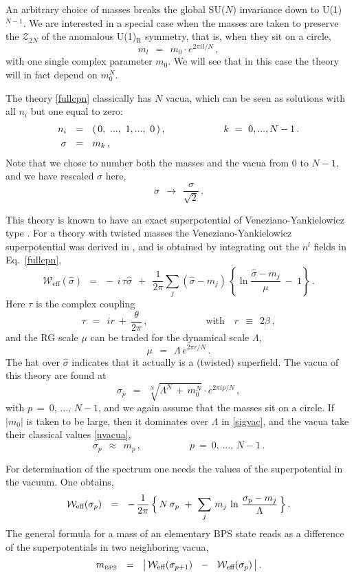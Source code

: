 \documentclass[epsfig,12pt]{article}
\def\beq{\begin{equation}}
\def\eeq{\end{equation}}
\def\beq{\begin{equation}}
\def\eeq{\end{equation}}
\newcommand{\mc}[1]{\mathcal{#1}}
\newcommand{\mbps}{m_{\text{\tiny BPS}}}
\newcommand{\W}{\mathcal{W}}
\newcommand{\hsigma}{{\hat{\sigma}}}
\begin{document}
	An arbitrary choice of masses breaks the global SU($N$) invariance down to U(1)$^{N-1}$.
	We are interested in a special case when the masses are taken to preserve the $ \mc{Z}_{2N} $ 
	of the anomalous U(1)$_\text{R}$ symmetry, that is, when they sit on a circle,
\beq
\label{mcirc}
	m_l ~~=~~ m_0 \cdot e^{2 \pi i l / N}\,,
\eeq
	with one single complex parameter $ m_0 $.
	We will see that in this case the theory will in fact depend on $ m_0^N $.


	The theory \eqref{fullcpn} classically has $ N $ vacua, which can be seen as solutions with all $ n_i $ but one 
	equal to zero:
\begin{align}
%
	n_i & ~~=~~ (\, 0,~ ...,~ 1, ...,~ 0\, )\,,  	\qquad\qquad\qquad  k ~=~ 0,..., N-1\,.
\notag
	\\
%
	\sigma & ~~=~~ m_k \,,
\label{nvacua}
\end{align}
	Note that we chose to number both the masses and the vacua from $0$ to $N-1$, and 
	we have rescaled $ \sigma $ here,
\beq
	\sigma ~~\to~~ \frac{\sigma}{\sqrt 2}\,.
\eeq

	This theory is known to have an exact superpotential of Veneziano-Yankielowicz type 
	\cite{VYan}.
	For a theory with twisted masses the Veneziano-Yankielowicz superpotential was 
	derived in \cite{AdDVecSal,ChVa,W93,HaHo,Dor}, 
	and is obtained by integrating out the $ n^l $ fields in Eq.~\eqref{fullcpn},
\beq
\label{Wfull}
	\W_\text{eff}(\hsigma) ~~=~~
		-\, i\, \tau \hsigma ~~+~~
		\frac{1}{2\pi} \sum_j (\hsigma - m_j)\, 
				      \left\{ \ln {\frac{\hsigma - m_j}{\mu}} ~-~ 1 \right\}\,.
\eeq
	Here $ \tau $ is the complex coupling
\beq
	\tau ~~=~~ i r ~+~ \frac{\theta}{2\pi}\,, \qquad\qquad\qquad   \text{with~~~} r ~~\equiv~~ 2\beta\,,
\eeq
	and the RG scale $ \mu $ can be traded for the dynamical scale $ \Lambda $,
\beq
	\mu ~~=~~ \Lambda\, e^{2\pi r/N}\,.
\eeq
	The hat over $ \hsigma $ indicates that it actually is a (twisted) superfield.
	The vacua of this theory are found at
\beq
\label{sigvac}
	\sigma_p ~~=~~ \sqrt[N] { \Lambda^N \,+\, m_0^N } \cdot e^{ 2\pi i p / N }\,, 
\eeq
	with $ p ~=~ 0,\,...,\, N-1 $, 
	and we again assume that the masses sit on a circle.
	If $ | m_ 0 | $ is taken to be large, then it dominates over $ \Lambda $ in \eqref{sigvac},
	and the vacua take their classical values \eqref{nvacua},
\beq
	\sigma_p ~~\approx~~ m_p\,, \qquad\qquad\quad p ~=~ 0,\,...,\,N-1\,.
\eeq

	For determination of the spectrum one needs the values of the superpotential
	in the vacuum.
	One obtains,
\beq
\label{Wvac}
	\W_\text{eff} ( \sigma_p ) ~~=~~ 
		-\, \frac{1}{2\pi}\,  
                \Bigl\{\, N\, \sigma_p ~+~ \sum_j\, m_j\, \ln \,\frac{\sigma_p - m_j}{\Lambda} \,\Bigr\}\,.
\eeq
	The general formula for a mass of an elementary BPS state reads as a difference of the 
	superpotentials in two neighboring vacua, 
\beq
\label{mbpsgen}
	\mbps ~~=~~ \big|\, \W_\text{eff} ( \sigma_{p+1} ) ~~-~~ \W_\text{eff} ( \sigma_p ) \,\big|\,.
\eeq
\end{document}
